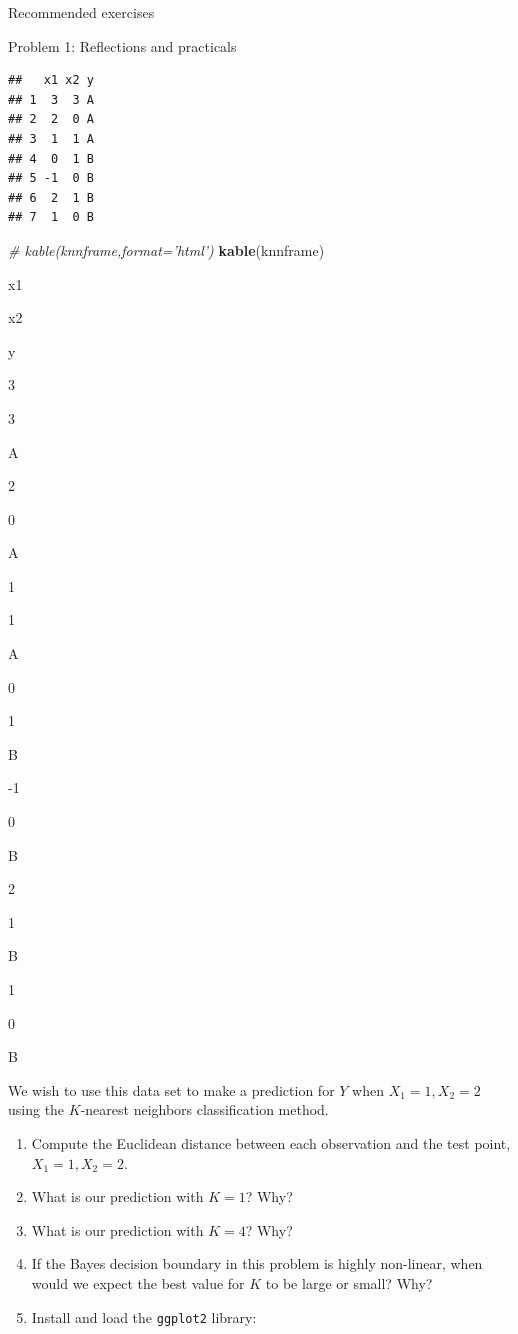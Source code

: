 \documentclass[ignorenonframetext,]{beamer}
\newenvironment{Shaded}{\begin{snugshade}}{\end{snugshade}}
\newcommand{\KeywordTok}[1]{\textcolor[rgb]{0.13,0.29,0.53}{\textbf{#1}}}
\newcommand{\CommentTok}[1]{\textcolor[rgb]{0.56,0.35,0.01}{\textit{#1}}}
\newcommand{\NormalTok}[1]{#1}
\providecommand{\tightlist}{%
  \setlength{\itemsep}{0pt}\setlength{\parskip}{0pt}}
\begin{document}
\begin{frame}[fragile]{Recommended exercises}
\begin{block}{Problem 1: Reflections and practicals}
\begin{verbatim}
##   x1 x2 y
## 1  3  3 A
## 2  2  0 A
## 3  1  1 A
## 4  0  1 B
## 5 -1  0 B
## 6  2  1 B
## 7  1  0 B
\end{verbatim}

\begin{Shaded}
\begin{Highlighting}[]
\CommentTok{# kable(knnframe,format='html')}
\KeywordTok{kable}\NormalTok{(knnframe)}
\end{Highlighting}
\end{Shaded}

x1

x2

y

3

3

A

2

0

A

1

1

A

0

1

B

-1

0

B

2

1

B

1

0

B

We wish to use this data set to make a prediction for \(Y\) when
\(X_1=1, X_2=2\) using the \(K\)-nearest neighbors classification
method.

\begin{enumerate}
\def\labelenumi{\alph{enumi}.}
\tightlist
\item
  Compute the Euclidean distance between each observation and the test
  point, \(X_1=1,X_2=2\).
\item
  What is our prediction with \(K=1\)? Why?
\item
  What is our prediction with \(K=4\)? Why?
\item
  If the Bayes decision boundary in this problem is highly non-linear,
  when would we expect the best value for \(K\) to be large or small?
  Why?
\item
  Install and load the \texttt{ggplot2} library:
\end{enumerate}


\end{block}
\end{frame}
\end{document}
